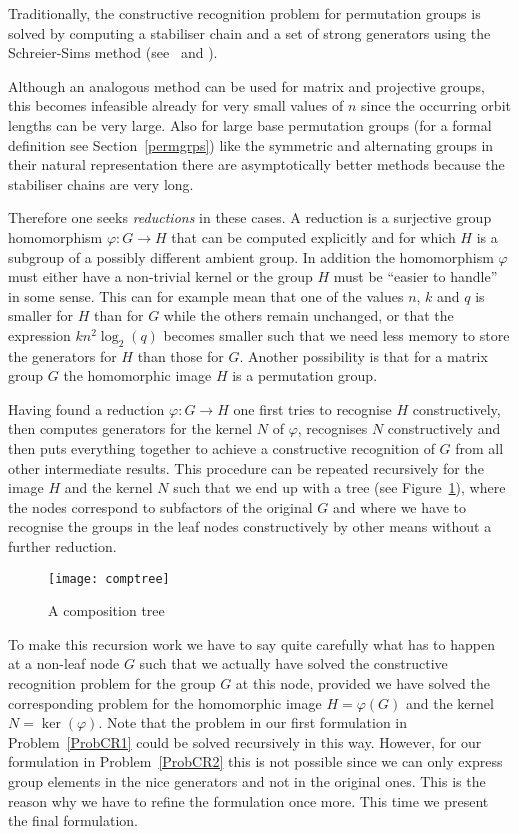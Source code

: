 Traditionally, the constructive recognition problem for permutation
groups is solved by computing a stabiliser chain and a set of strong
generators using the Schreier-Sims method (see~\cite{Si} and \cite{Ser}). 

Although an analogous method can be used for matrix and projective groups,
this becomes infeasible already for very small values of $n$ since the
occurring orbit lengths can be very large. Also for large base permutation
groups (for a formal definition see Section~\ref{permgrps}) like the
symmetric and alternating groups in their natural representation there
are asymptotically better methods because the stabiliser chains are very long.

Therefore one seeks \emph{reductions} in these cases. A reduction is
a surjective group homomorphism $\varphi : G \to H$ that can be computed
explicitly and for which $H$ is a subgroup of a possibly different
ambient group. In addition the homomorphism $\varphi$ must either have
a non-trivial kernel or the group $H$ must be ``easier to handle'' in some
sense. This can for example mean that one of the values $n$, $k$ and
$q$ is smaller for $H$ than for $G$ while the others remain unchanged,
or that the expression $kn^2\log_2(q)$ becomes smaller such that we need
less memory to store the generators for $H$ than those for $G$.
Another possibility is that for a matrix group $G$ the homomorphic image
$H$ is a permutation group.

%
Having found a reduction $\varphi : G \to H$ one first tries to recognise
$H$ constructively, then computes generators for the kernel $N$ of
$\varphi$, recognises $N$ constructively and then puts everything together
to achieve a constructive recognition of $G$ from all other intermediate
results. This procedure can be repeated recursively for the image $H$ and
the kernel $N$ such that we end up with a tree (see
Figure~\ref{comptreefig}), where the nodes correspond
to subfactors of the original $G$ and where we have to recognise
the groups in the leaf nodes constructively by other means without
a further reduction.
%

\begin{figure}
\begin{center}
\texttt{[image: comptree]}
\end{center}
\caption{A composition tree}
\label{comptreefig}
%
\end{figure}

To make this recursion work we have to say quite carefully what has to
happen at a non-leaf node $G$ such that we actually have solved the
constructive recognition problem for the group $G$ at this node, provided
we have solved the corresponding problem for the homomorphic image
$H=\varphi(G)$ and the kernel $N = \ker(\varphi)$. Note that the problem
in our first formulation in Problem~\ref{ProbCR1} could be solved
recursively in this way. However, for our formulation in Problem~\ref{ProbCR2}
this is not possible since we can only express group elements in the nice
generators and not in the original ones. This is the reason why we have to
refine the formulation once more. This time we present the final
formulation.

